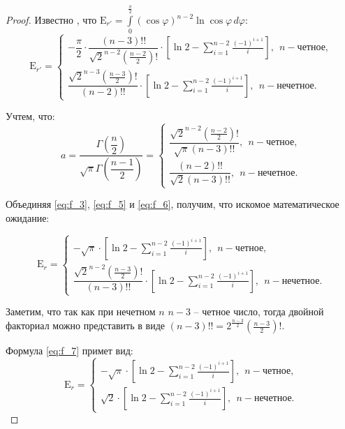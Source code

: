 \documentclass[specialist,
substylefile = spbu.rtx,
               subf,href,colorlinks=true, 12pt]{disser}
\begin{document}
\begin{proof}
Известно \cite{gradshteyn}, что  $\displaystyle \mathrm{E}_{r'} = \int\limits_0^{\frac {\pi}{2}} (\cos \varphi)^{n-2} \ln \cos \varphi \, d\varphi: $ 
\begin{equation}
\displaystyle
\mathrm{E}_{r'}= \left\{\begin{array}{l}  -\dfrac{\pi}{2}\cdot \dfrac{(n-3)!!}{\sqrt{2}^{n-2}\left(\frac{n-2}{2}\right)!}\cdot \left[\ln 2 - \displaystyle \sum\limits_{i=1}^{n-2}\frac{(-1)^{i+1}}{i}\right],\; \, n-\text{четное},\\[3ex] 
\dfrac{\sqrt{2}^{n-3}\left(\frac{n-3}{2}\right)!}{(n-2)!!}\cdot \left[\ln 2 - \displaystyle \sum\limits_{i=1}^{n-2}\frac{(-1)^{i+1}}{i}\right],\; \, n-\text{нечетное}.
\end{array}\right.
\label{eq:f_5}
\end{equation}

Учтем, что:
\begin{equation}
a=\dfrac{\Gamma\left(\dfrac{n}{2}\right)}{\sqrt{\pi} \Gamma\left(\dfrac{n-1}{2}\right)}= \left\{\begin{array}{l} \displaystyle \dfrac{\sqrt{2}^{n-2}\left(\frac{n-2}{2}\right)!}{\sqrt{\pi}(n-3)!!} ,\; \, n-\text{четное},\\[2.5ex] 
\displaystyle \dfrac{(n-2)!!}{\sqrt{2}(n-3)!!} ,\; \, n-\text{нечетное}.
\end{array}\right.
\label{eq:f_6}
\end{equation}
\vspace{-1ex}

Объединяя \ref{eq:f_3}, \ref{eq:f_5} и \ref{eq:f_6}, получим, что искомое математическое ожидание:
\vspace{-4.5ex}

\begin{equation}
\displaystyle
\mathrm{E}_{r}= \left\{\begin{array}{l}  -\sqrt{\pi}\cdot  \left[\ln 2 - \displaystyle \sum\limits_{i=1}^{n-2}\frac{(-1)^{i+1}}{i}\right],\; \, n-\text{четное},\\[3ex] 
\dfrac{\sqrt{2}^{n-2}\left(\frac{n-3}{2}\right)!}{(n-3)!!}\cdot \left[\ln 2 - \displaystyle \sum\limits_{i=1}^{n-2}\frac{(-1)^{i+1}}{i}\right],\; \, n-\text{нечетное}.
\end{array}\right.
\label{eq:f_7}
\end{equation}
\vspace{-0.5ex}

Заметим, что так как при нечетном $n$ $n-3$ -- четное число, тогда двойной факториал можно представить в виде $(n-3)!!=2^{\frac{n-3}{2}}\left(\frac{n-3}{2}\right)!.$ 

Формула \ref{eq:f_7} примет вид:
\begin{equation}
\displaystyle
\mathrm{E}_{r}= \left\{\begin{array}{l}  -\sqrt{\pi}\cdot  \left[\ln 2 - \displaystyle \sum\limits_{i=1}^{n-2}\frac{(-1)^{i+1}}{i}\right],\; \, n-\text{четное},\\[3ex] 
\sqrt{2}\cdot \left[\ln 2 - \displaystyle \sum\limits_{i=1}^{n-2}\frac{(-1)^{i+1}}{i}\right],\; \, n-\text{нечетное}.
\end{array}\right.
\label{eq:f_8}
\end{equation}
\end{proof}
\end{document}
